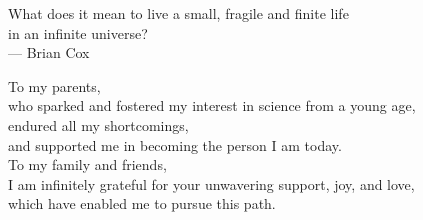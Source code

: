 \cleardoublepage
\thispagestyle{empty}


\vspace*{3cm}

\begin{raggedleft}
    	What does it mean to live a small, fragile and finite life \\
	 in an infinite universe?\\
     --- Brian Cox\\
\end{raggedleft}

\vspace{4cm}

\begin{center}
    To my parents, \\
    who sparked and fostered my interest in science from a young age, \\
    endured all my shortcomings, \\
    and supported me in becoming the person I am today. \\
    To my family and friends, \\
    I am infinitely grateful for your unwavering support, joy, and love, \\
    which have enabled me to pursue this path.
\end{center}


